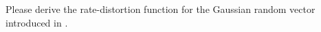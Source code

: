 \documentclass[../../book-main.tex]{subfiles}
\begin{document}
\begin{exercise}\label{exer:KKT}
    Please derive the rate-distortion function for
    the Gaussian random vector introduced in
    .





\end{exercise}
\end{document}
